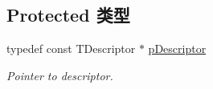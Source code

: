 \subsection*{Protected 类型}
\begin{DoxyCompactItemize}
\item 
\hypertarget{classDBoW2_1_1TemplatedVocabulary_a40913d67e369e6993c2eab80a968f829}{typedef const T\-Descriptor $\ast$ \hyperlink{classDBoW2_1_1TemplatedVocabulary_a40913d67e369e6993c2eab80a968f829}{p\-Descriptor}}\label{classDBoW2_1_1TemplatedVocabulary_a40913d67e369e6993c2eab80a968f829}

\begin{DoxyCompactList}\small\item\em Pointer to descriptor. \end{DoxyCompactList}\end{DoxyCompactItemize}
